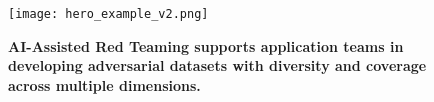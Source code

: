 \begin{figure}
[h!tbp]
    \texttt{[image: hero\_example\_v2.png]}
    \caption{\bf{AI-Assisted} Red Teaming supports application teams in developing adversarial datasets with diversity and coverage across multiple dimensions.}
    \label{fig:prompt}
\end{figure}